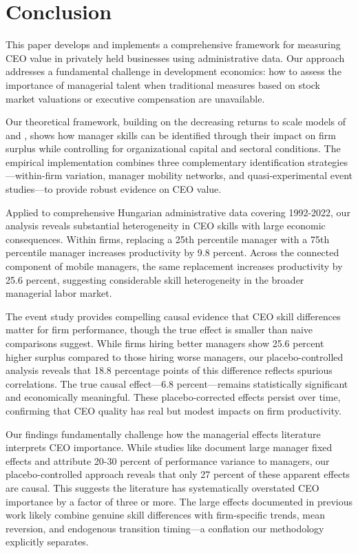 \documentclass[11pt,a4paper]{article}
\begin{document}
\section{Conclusion}

This paper develops and implements a comprehensive framework for measuring CEO value in privately held businesses using administrative data. Our approach addresses a fundamental challenge in development economics: how to assess the importance of managerial talent when traditional measures based on stock market valuations or executive compensation are unavailable.

Our theoretical framework, building on the decreasing returns to scale models of \citet{AtkesonKehoe2005JPE} and \citet{McGrattan2012RED}, shows how manager skills can be identified through their impact on firm surplus while controlling for organizational capital and sectoral conditions. The empirical implementation combines three complementary identification strategies---within-firm variation, manager mobility networks, and quasi-experimental event studies---to provide robust evidence on CEO value.

Applied to comprehensive Hungarian administrative data covering 1992-2022, our analysis reveals substantial heterogeneity in CEO skills with large economic consequences. Within firms, replacing a 25th percentile manager with a 75th percentile manager increases productivity by 9.8 percent. Across the connected component of mobile managers, the same replacement increases productivity by 25.6 percent, suggesting considerable skill heterogeneity in the broader managerial labor market.

The event study provides compelling causal evidence that CEO skill differences matter for firm performance, though the true effect is smaller than naive comparisons suggest. While firms hiring better managers show 25.6 percent higher surplus compared to those hiring worse managers, our placebo-controlled analysis reveals that 18.8 percentage points of this difference reflects spurious correlations. The true causal effect---6.8 percent---remains statistically significant and economically meaningful. These placebo-corrected effects persist over time, confirming that CEO quality has real but modest impacts on firm productivity.

Our findings fundamentally challenge how the managerial effects literature interprets CEO importance. While studies like \citet{Bertrand2003-io} document large manager fixed effects and \citet{metcalfe2023managers} attribute 20-30 percent of performance variance to managers, our placebo-controlled approach reveals that only 27 percent of these apparent effects are causal. This suggests the literature has systematically overstated CEO importance by a factor of three or more. The large effects documented in previous work likely combine genuine skill differences with firm-specific trends, mean reversion, and endogenous transition timing---a conflation our methodology explicitly separates.
\end{document}
